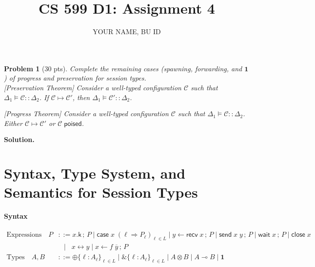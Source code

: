 \documentclass{article}
\title{CS 599 D1: Assignment 4}
\author{YOUR NAME, BU ID}
\date{}
\newcommand{\m}[1]{\mathsf{#1}}
\newcommand{\step}{\mapsto}
\newcommand{\semi}{\,;\,}
\newcommand{\ecase}[3]{\m{case} \; #1 \; (#2 \Rightarrow #3)}
\newcommand{\erecv}[2]{#2 \leftarrow \m{recv} \; #1}
\newcommand{\esend}[2]{\m{send} \; #1 \; #2}
\newcommand{\ewait}[1]{\m{wait} \; #1}
\newcommand{\eclose}[1]{\m{close} \; #1}
\newcommand{\fwd}[2]{#1 \leftrightarrow #2}
\newcommand{\espawn}[3]{#1 \leftarrow #2 \; #3}
\newcommand{\ichoice}[1]{\oplus\{#1\}}
\newcommand{\echoice}[1]{\&\{#1\}}
\newcommand{\one}{\mathbf{1}}
\newcommand{\config}{\mathcal{C}}
\newcommand{\D}{\Delta}
\newcommand{\poised}[1]{#1 \; \m{poised}}
\newtheorem{problem}{Problem}
\newenvironment{solution}{\textbf{Solution.}}{}
\begin{document}
\maketitle


\begin{problem}[30 pts]
  Complete the remaining cases (spawning, forwarding, and $\one$) of progress and preservation for session types.\\

  [Preservation Theorem] Consider a well-typed configuration $\config$ such that $\D_1 \vDash \config :: \D_2$.
  If $\config \step \config'$, then $\D_1 \vDash \config' :: \D_2$.

  [Progress Theorem] Consider a well-typed configuration $\config$ such that $\D_1 \vDash \config :: \D_2$.
  Either $\config \step \config'$ or $\poised{\config}$.
\end{problem}

\begin{solution}
  
\end{solution}

\appendix

\section{Syntax, Type System, and Semantics for Session Types}\label{app:st}

\paragraph*{Syntax}
\begin{align*}
  \text{Expressions} \quad P & ::= x.\m{k} \semi P \mid \ecase{x}{\ell}{P_{\ell}}_{\ell \in L} \mid \erecv{x}{y} \semi P \mid \esend{x}{y} \semi P \mid \ewait{x} \semi P \mid \eclose{x} \\
  & \;\; \mid \;\; \fwd{x}{y} \mid \espawn{x}{f}{\overline{y}} \semi P \\
  \text{Types} \quad A, B & ::= \ichoice{\ell : A_{\ell}}_{\ell \in L} \mid \echoice{\ell : A_{\ell}}_{\ell \in L} \mid
  A \otimes B \mid A \multimap B \mid \one
\end{align*}
\end{document}
